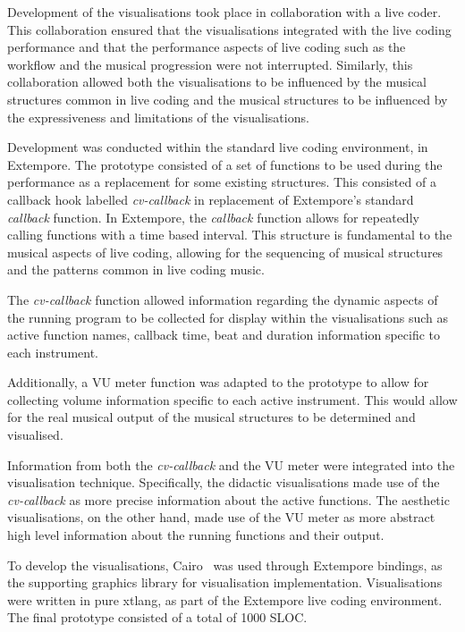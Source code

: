 Development of the visualisations took place in collaboration with a live coder. This collaboration ensured that the visualisations integrated with the live coding performance and that the performance aspects of live coding such as the workflow and the musical progression were not interrupted. Similarly, this collaboration allowed both the visualisations to be influenced by the musical structures common in live coding and the musical structures to be influenced by the expressiveness and limitations of the visualisations.

Development was conducted within the standard live coding environment, in Extempore. The prototype consisted of a set of functions to be used during the performance as a replacement for some existing structures. This consisted of a callback hook labelled \textit{cv-callback} in replacement of Extempore's standard \textit{callback} function. In Extempore, the \textit{callback} function allows for repeatedly calling functions with a time based interval. This structure is fundamental to the musical aspects of live coding, allowing for the sequencing of musical structures and the patterns common in live coding music.

The \textit{cv-callback} function allowed information regarding the dynamic aspects of the running program to be collected for display within the visualisations such as active function names, callback time, beat and duration information specific to each instrument.

Additionally, a \ac{VU} meter function was adapted to the prototype to allow for collecting volume information specific to each active instrument. This would allow for the real musical output of the musical structures to be determined and visualised.

Information from both the \textit{cv-callback} and the \ac{VU} meter were integrated into the visualisation technique. Specifically, the didactic visualisations made use of the \textit{cv-callback} as more precise information about the active functions. The aesthetic visualisations, on the other hand, made use of the \ac{VU} meter as more abstract high level information about the running functions and their output.

To develop the visualisations, Cairo~\cite{Worth2012} was used through Extempore bindings, as the supporting graphics library for visualisation implementation. Visualisations were written in pure xtlang, as part of the Extempore live coding environment. The final prototype consisted of a total of 1000 \ac{SLOC}.

